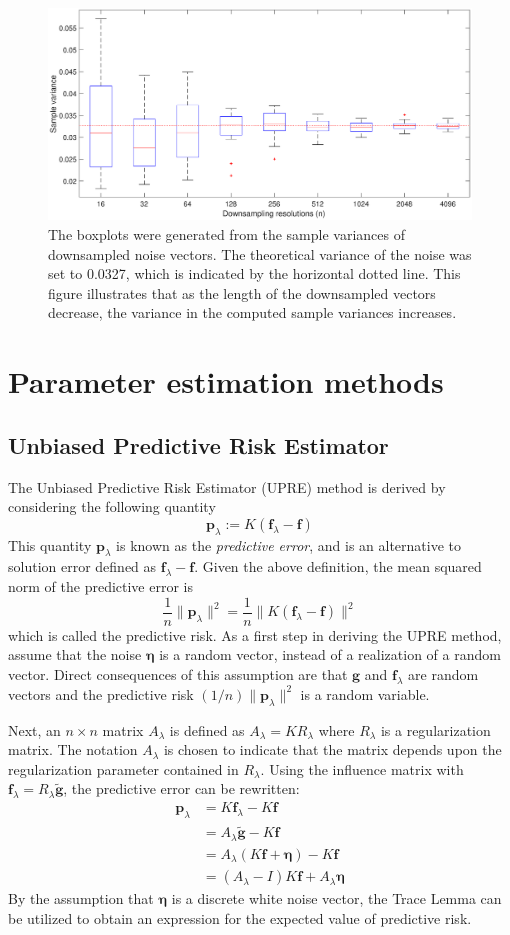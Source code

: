 \documentclass[12pt]{article}
\newcommand{\gdis}{\mathbf{g}}
\newcommand{\gnoise}{\widetilde{\mathbf{g}}}
\newcommand{\kmat}{K}	%
\newcommand{\fdis}{\mathbf{f}}
\newcommand{\regparam}{\lambda}
\newcommand{\R}{R_{\regparam}}	%
\newcommand{\freg}{\fdis_{\regparam}}	%
\newcommand{\noise}{\bm{\eta}}	%
\newcommand{\PE}{\mathbf{p}_{\regparam}}	%
\newcommand{\A}{A_{\regparam}}	%
\begin{document}
\begin{figure}
\centerline{\includegraphics[scale=0.45]{Figures/VarPlot1D_F1_S05_W100_R20.eps}}
\caption{The boxplots were generated from the sample variances of downsampled noise vectors. The theoretical variance of the noise was set to 0.0327, which is indicated by the horizontal dotted line. This figure illustrates that as the length of the downsampled vectors decrease, the variance in the computed sample variances increases.}
\label{VarPlot1D}
\end{figure}

\section{Parameter estimation methods}

\subsection{Unbiased Predictive Risk Estimator}
The Unbiased Predictive Risk Estimator (UPRE) method is derived by considering the following quantity
\[\PE := \kmat(\freg - \fdis)\]
This quantity $\PE$ is known as the \textit{predictive error}, and is an alternative to solution error defined as $\freg - \fdis$. Given the above definition, the mean squared norm of the predictive error is
\[\frac{1}{n}\|\PE\|^2 = \frac{1}{n}\|\kmat(\freg - \fdis)\|^2\]
which is called the predictive risk.  As a first step in deriving the UPRE method, assume that the noise $\noise$ is a random vector, instead of a realization of a random vector. Direct consequences of this assumption are that $\gdis$ and $\freg$ are random vectors and the predictive risk $(1/n)\|\PE\|^2$ is a random variable. \par
Next, an $n \times n$ matrix $\A$ is defined as $\A = \kmat\R$ where $\R$ is a regularization matrix. The notation $\A$ is chosen to indicate that the matrix depends upon the regularization parameter contained in $\R$. Using the influence matrix with $\freg = \R\gnoise$, the predictive error can be rewritten:
\begin{align*}
\PE &= \kmat\freg - \kmat\fdis \\
&= \A\gnoise - \kmat\fdis \\
&= \A(\kmat\fdis + \noise) - \kmat\fdis \\
&= (\A - I)\kmat\fdis + \A\noise
\end{align*}
By the assumption that $\noise$ is a discrete white noise vector, the Trace Lemma can be utilized to obtain an expression for the expected value of predictive risk.
\end{document}
